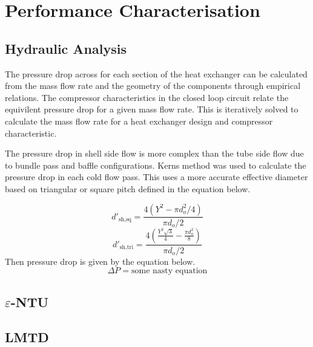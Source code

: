 \documentclass{article}
\begin{document}

\section{Performance Characterisation}

\subsection{Hydraulic Analysis}

The pressure drop across for each section of the heat exchanger can be calculated from the mass flow rate and the geometry of the components through empirical relations.
The compressor characteristics in the closed loop circuit relate the equivilent pressure drop for a given mass flow rate.
This is iteratively solved to calculate the mass flow rate for a heat exchanger design and compressor characteristic.

The pressure drop in shell side flow is more complex than the tube side flow due to bundle pass and baffle configurations.
Kerns method was used to calculate the pressure drop in each cold flow pass.
This uses a more accurate effective diameter based on triangular or square pitch defined in the equation below.

\begin{equation}
  d'_{\text{sh,sq}} = \frac{4(Y^2 - \pi d_o^2/4)}{\pi d_o / 2}
\end{equation}
\begin{equation}
  d'_{\text{sh,tri}} = \frac{4(\frac{Y^2 \sqrt{3}}{4} - \frac{\pi d_o^2}{8})}{\pi d_o / 2}
\end{equation}
Then pressure drop is given by the equation below.
\begin{equation}
  \Delta P = \text{some nasty equation}
\end{equation}


\subsection{$\varepsilon$-NTU}

\subsection{LMTD}
\end{document}
